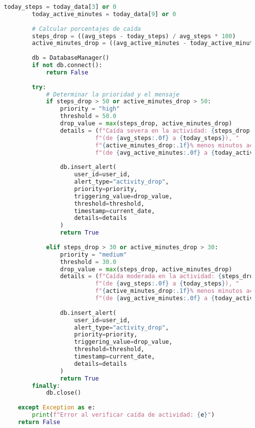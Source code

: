 \begin{lstlisting}[language=Python, caption=Implementación de la regla de alerta para caída de actividad]
        today_steps = today_data[3] or 0
        today_active_minutes = today_data[9] or 0
            
        # Calcular porcentajes de caída
        steps_drop = ((avg_steps - today_steps) / avg_steps * 100)
        active_minutes_drop = ((avg_active_minutes - today_active_minutes) / avg_active_minutes * 100)
        
        db = DatabaseManager()
        if not db.connect():
            return False
            
        try:
            # Determinar la prioridad y el mensaje
            if steps_drop > 50 or active_minutes_drop > 50:
                priority = "high"
                threshold = 50.0
                drop_value = max(steps_drop, active_minutes_drop)
                details = (f"Caída severa en la actividad: {steps_drop:.1f}% menos pasos "
                          f"(de {avg_steps:.0f} a {today_steps}), "
                          f"{active_minutes_drop:.1f}% menos minutos activos "
                          f"(de {avg_active_minutes:.0f} a {today_active_minutes})")
                
                db.insert_alert(
                    user_id=user_id,
                    alert_type="activity_drop",
                    priority=priority,
                    triggering_value=drop_value,
                    threshold=threshold,
                    timestamp=current_date,
                    details=details
                )
                return True
                
            elif steps_drop > 30 or active_minutes_drop > 30:
                priority = "medium"
                threshold = 30.0
                drop_value = max(steps_drop, active_minutes_drop)
                details = (f"Caída moderada en la actividad: {steps_drop:.1f}% menos pasos "
                          f"(de {avg_steps:.0f} a {today_steps}), "
                          f"{active_minutes_drop:.1f}% menos minutos activos "
                          f"(de {avg_active_minutes:.0f} a {today_active_minutes})")
                
                db.insert_alert(
                    user_id=user_id,
                    alert_type="activity_drop",
                    priority=priority,
                    triggering_value=drop_value,
                    threshold=threshold,
                    timestamp=current_date,
                    details=details
                )
                return True
        finally:
            db.close()
            
    except Exception as e:
        print(f"Error al verificar caída de actividad: {e}")
    return False
\end{lstlisting}

